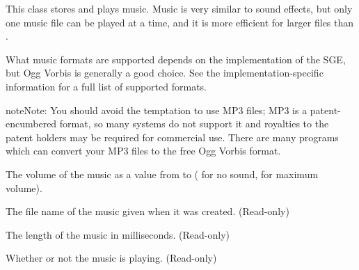 \documentclass[letterpaper,10pt,english]{sphinxmanual}
\begin{document}
\begin{fulllineitems}
\label{snd:sge.snd.Music}
This class stores and plays music.  Music is very similar to sound
effects, but only one music file can be played at a time, and it is
more efficient for larger files than {\hyperref[snd:sge.snd.Sound]{\emph{}}}.

What music formats are supported depends on the implementation of
the SGE, but Ogg Vorbis is generally a good choice.  See the
implementation-specific information for a full list of supported
formats.

\begin{notice}{note}{Note:}
You should avoid the temptation to use MP3 files; MP3 is a
patent-encumbered format, so many systems do not support it and
royalties to the patent holders may be required for commercial
use.  There are many programs which can convert your MP3 files to
the free Ogg Vorbis format.
\end{notice}

\begin{fulllineitems}
\label{snd:sge.snd.Music.volume}
The volume of the music as a value from  to  ( for
no sound,  for maximum volume).

\end{fulllineitems}


\begin{fulllineitems}
\label{snd:sge.snd.Music.fname}
The file name of the music given when it was created.
(Read-only)

\end{fulllineitems}


\begin{fulllineitems}
\label{snd:sge.snd.Music.length}
The length of the music in milliseconds.  (Read-only)

\end{fulllineitems}


\begin{fulllineitems}
\label{snd:sge.snd.Music.playing}
Whether or not the music is playing.  (Read-only)


\end{fulllineitems}
\end{fulllineitems}
\end{document}
